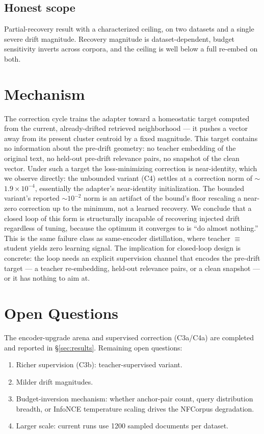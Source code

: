 \documentclass[12pt]{article}
\begin{document}
\subsection{Honest scope}
\label{sec:honest-scope}

Partial-recovery result with a characterized ceiling, on two datasets and a single severe drift magnitude. Recovery magnitude is dataset-dependent, budget sensitivity inverts across corpora, and the ceiling is well below a full re-embed on both.

\section{Mechanism}
\label{sec:mechanism}

The correction cycle trains the adapter toward a homeostatic target computed from the current, already-drifted retrieved neighborhood --- it pushes a vector away from its present cluster centroid by a fixed magnitude. This target contains no information about the pre-drift geometry: no teacher embedding of the original text, no held-out pre-drift relevance pairs, no snapshot of the clean vector. Under such a target the loss-minimizing correction is near-identity, which we observe directly: the unbounded variant (C4) settles at a correction norm of $\sim$$1.9\times10^{-4}$, essentially the adapter's near-identity initialization. The bounded variant's reported $\sim$$10^{-2}$ norm is an artifact of the bound's floor rescaling a near-zero correction up to the minimum, not a learned recovery. We conclude that a closed loop of this form is structurally incapable of recovering injected drift regardless of tuning, because the optimum it converges to is ``do almost nothing.'' This is the same failure class as same-encoder distillation, where teacher $\equiv$ student yields zero learning signal. The implication for closed-loop design is concrete: the loop needs an explicit supervision channel that encodes the pre-drift target --- a teacher re-embedding, held-out relevance pairs, or a clean snapshot --- or it has nothing to aim at.

\section{Open Questions}
\label{sec:open}

The encoder-upgrade arena and supervised correction (C3a/C4a) are completed and reported in \S\ref{sec:results}. Remaining open questions:
\begin{enumerate}
  \item Richer supervision (C3b): teacher-supervised variant.
  \item Milder drift magnitudes.
  \item Budget-inversion mechanism: whether anchor-pair count, query distribution breadth, or InfoNCE temperature scaling drives the NFCorpus degradation.
  \item Larger scale: current runs use 1200 sampled documents per dataset.
\end{enumerate}
\end{document}
